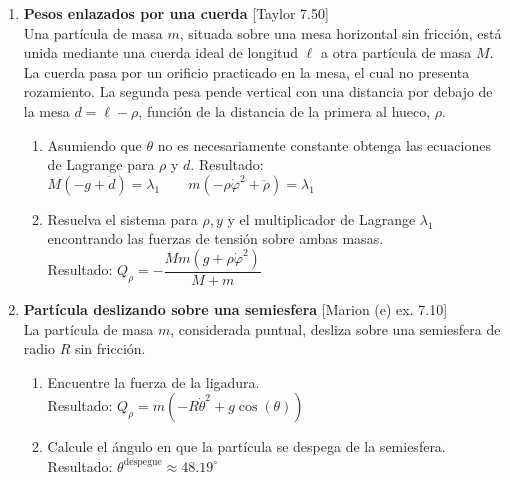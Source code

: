 \documentclass[11pt, spanish, a4paper, twoside]{article}
\begin{document}
\begin{enumerate}

	\item
	\begin{minipage}[t][7.5cm]{0.65\textwidth}
		\textbf{Pesos enlazados por una cuerda} [Taylor 7.50]\\
		Una partícula de masa \(m\), situada sobre una mesa horizontal sin fricción, está unida mediante una cuerda ideal de longitud \(\ell\) a otra partícula de masa \(M\).
		La cuerda pasa por un orificio practicado en la mesa, el cual no presenta rozamiento.
		La segunda pesa pende vertical con una distancia por debajo de la mesa \(d = \ell - \rho\), función de la distancia de la primera al hueco, \(\rho\).
		\begin{enumerate}
			\item Asumiendo que \(\theta\) no es necesariamente constante obtenga las ecuaciones de Lagrange para \(\rho\) y \(d\). Resultado:\\[5 pt]
			\(M \left(- g + \ddot{d}\right) = \lambda_{1} \qquad m \left(- \rho \dot{\varphi}^{2} + \ddot{\rho}\right) = \lambda_{1}\)
			\item Resuelva el sistema para \(\rho, y\) y el multiplicador de Lagrange \(\lambda_1\) encontrando las fuerzas de tensión sobre ambas masas.\\[5 pt]
			Resultado: \(Q_{\rho} = - \dfrac{M m \left(g + \rho \dot{\varphi}^{2}\right)}{M + m}\)
		\end{enumerate}
	\end{minipage}
	\begin{minipage}[c][-1cm][t]{0.3\textwidth}
		
	\end{minipage}


	\item
	\begin{minipage}[t][4.5cm]{0.62\textwidth}
		\textbf{Partícula deslizando sobre una semiesfera} [Marion (e) ex. 7.10]\\
		La partícula de masa \(m\), considerada puntual, desliza sobre una semiesfera de radio \(R\) sin fricción.
		\begin{enumerate}
			\item Encuentre la fuerza de la ligadura.\\
			Resultado: \(Q_{\rho} = m \left(- R \dot{\theta}^{2} + g \cos{\left(\theta \right)}\right)\)
			\item Calcule el ángulo en que la partícula se despega de la semiesfera.\\
			Resultado: \(\theta^\mathrm{despegue} \approx 48.19^\circ\) 
		\end{enumerate}
	\end{minipage}
	\begin{minipage}[c][0cm][t]{0.3\textwidth}
		
	\end{minipage}
	

\end{enumerate}
\end{document}
